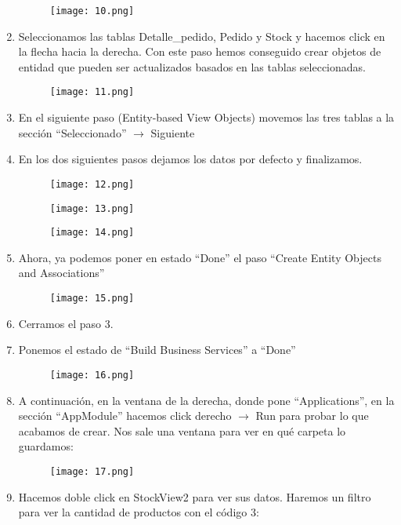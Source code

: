 \begin{enumerate}
	\begin{figure}[!h]
	  \centering
	    \texttt{[image: 10.png]}
	\end{figure}
	\item Seleccionamos las tablas Detalle\_pedido, Pedido y Stock y hacemos click en la flecha hacia la derecha. Con este paso hemos conseguido crear objetos de entidad que pueden ser actualizados basados en las tablas seleccionadas.
	\pagebreak
	\begin{figure}[!h]
	  \centering
	    \texttt{[image: 11.png]}
	\end{figure}
	\item En el siguiente paso (Entity-based View Objects) movemos las tres tablas a la sección ``Seleccionado'' $\rightarrow$ Siguiente
	\item En los dos siguientes pasos dejamos los datos por defecto y finalizamos.
	\begin{figure}[!h]
	  \centering
	    \texttt{[image: 12.png]}
	\end{figure}
	\pagebreak
	\begin{figure}[!h]
	  \centering
	    \texttt{[image: 13.png]}
	\end{figure}
	\begin{figure}[!h]
	  \centering
	    \texttt{[image: 14.png]}
	\end{figure}
	\item Ahora, ya podemos poner en estado ``Done'' el paso ``Create Entity Objects and Associations''
	\pagebreak
	\begin{figure}[!h]
	  \centering
	    \texttt{[image: 15.png]}
	\end{figure}
	\item Cerramos el paso 3.
	\item Ponemos el estado de ``Build Business Services'' a ``Done''
	\begin{figure}[!h]
	  \centering
	    \texttt{[image: 16.png]}
	\end{figure}
	\item A continuación, en la ventana de la derecha, donde pone ``Applications'', en la sección ``AppModule'' hacemos click derecho $\rightarrow$ Run para probar lo que acabamos de crear. Nos sale una ventana para ver en qué carpeta lo guardamos:
	\pagebreak
	\begin{figure}[!h]
	  \centering
	    \texttt{[image: 17.png]}
	\end{figure}
	\item Hacemos doble click en StockView2 para ver sus datos. Haremos un filtro para ver la cantidad de productos con el código 3:

\end{enumerate}
